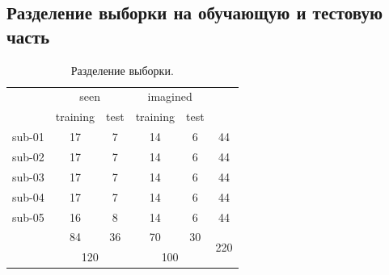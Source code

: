 \documentclass{beamer}
\begin{document}
		\subsection{Разделение выборки на обучающую и тестовую часть}
			\begin{frame}		
				\vspace{1cm}
				
				\begin{table}
					\begin{tabular}{c|cc|cc|c}
						& \multicolumn{2}{c|}{seen}            & \multicolumn{2}{c|}{imagined}        &                      \\ \cline{2-5}
						& \multicolumn{1}{c|}{training} & test & \multicolumn{1}{c|}{training} & test &                      \\ \hline
						sub-01 & \multicolumn{1}{c|}{17}       & 7    & \multicolumn{1}{c|}{14}       & 6    & 44                   \\
						sub-02 & \multicolumn{1}{c|}{17}       & 7    & \multicolumn{1}{c|}{14}       & 6    & 44                   \\
						sub-03 & \multicolumn{1}{c|}{17}       & 7    & \multicolumn{1}{c|}{14}       & 6    & 44                   \\
						sub-04 & \multicolumn{1}{c|}{17}       & 7    & \multicolumn{1}{c|}{14}       & 6    & 44                   \\
						sub-05 & \multicolumn{1}{c|}{16}       & 8    & \multicolumn{1}{c|}{14}       & 6    & 44                   \\ \hline
						& \multicolumn{1}{c|}{84}       & 36   & \multicolumn{1}{c|}{70}       & 30   & \multirow{2}{*}{220} \\ \cline{2-5}
						& \multicolumn{2}{c|}{120}             & \multicolumn{2}{c|}{100}             &                     		
					\end{tabular}				
					\caption{Разделение выборки.} 
				\end{table}
			\end{frame}
			
\end{document}
